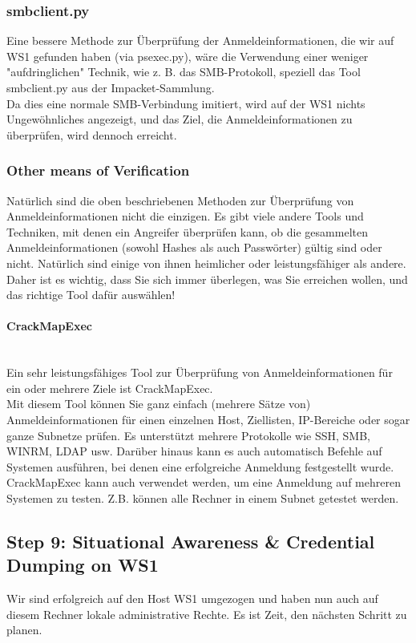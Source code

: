 \subsubsection{smbclient.py}
Eine bessere Methode zur Überprüfung der Anmeldeinformationen, die wir auf WS1 gefunden haben (via psexec.py), wäre die Verwendung einer weniger "aufdringlichen" Technik, wie z. B. das SMB-Protokoll, speziell das Tool smbclient.py aus der Impacket-Sammlung.\\

Da dies eine normale SMB-Verbindung imitiert, wird auf der WS1 nichts Ungewöhnliches angezeigt, und das Ziel, die Anmeldeinformationen zu überprüfen, wird dennoch erreicht.

\subsubsection{Other means of Verification}
Natürlich sind die oben beschriebenen Methoden zur Überprüfung von Anmeldeinformationen nicht die einzigen. Es gibt viele andere Tools und Techniken, mit denen ein Angreifer überprüfen kann, ob die gesammelten Anmeldeinformationen (sowohl Hashes als auch Passwörter) gültig sind oder nicht. Natürlich sind einige von ihnen heimlicher oder leistungsfähiger als andere. Daher ist es wichtig, dass Sie sich immer überlegen, was Sie erreichen wollen, und das richtige Tool dafür auswählen!

\paragraph{CrackMapExec}\mbox{} \\
Ein sehr leistungsfähiges Tool zur Überprüfung von Anmeldeinformationen für ein oder mehrere Ziele ist CrackMapExec.\\

Mit diesem Tool können Sie ganz einfach (mehrere Sätze von) Anmeldeinformationen für einen einzelnen Host, Ziellisten, IP-Bereiche oder sogar ganze Subnetze prüfen. Es unterstützt mehrere Protokolle wie SSH, SMB, WINRM, LDAP usw. Darüber hinaus kann es auch automatisch Befehle auf Systemen ausführen, bei denen eine erfolgreiche Anmeldung festgestellt wurde.\\

CrackMapExec kann auch verwendet werden, um eine Anmeldung auf mehreren Systemen zu testen. Z.B. können alle Rechner in einem Subnet getestet werden.

\newpage

\subsection{Step 9: Situational Awareness \& Credential Dumping on WS1}
Wir sind erfolgreich auf den Host WS1 umgezogen und haben nun auch auf diesem Rechner lokale administrative Rechte. Es ist Zeit, den nächsten Schritt zu planen.

